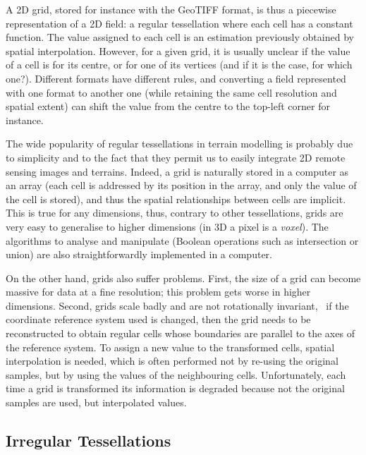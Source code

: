 %

\begin{kaobox}[frametitle=\faCog\ Concrete example: a 2D grid]
  A 2D grid, stored for instance with the GeoTIFF format, is thus a piecewise representation of a 2D field: a regular tessellation where each cell has a constant function.
  The value assigned to each cell is an estimation previously obtained by spatial interpolation.
  However, for a given grid, it is usually unclear if the value of a cell is for its centre, or for one of its vertices (and if it is the case, for which one?).
  Different formats have different rules, and converting a field represented with one format to another one (while retaining the same cell resolution and spatial extent) can shift the value from the centre to the top-left corner for instance.
\end{kaobox}

%

The wide popularity of regular tessellations in terrain modelling is probably due to simplicity and to the fact that they permit us to easily integrate 2D remote sensing images and terrains.
Indeed, a grid is naturally stored in a computer as an array (each cell is addressed by its position in the array, and only the value of the cell is stored), and thus the spatial relationships between cells are implicit. 
This is true for any dimensions, thus, contrary to other tessellations, grids are very easy to generalise to higher dimensions (in 3D a pixel is a \emph{voxel}).%
The algorithms to analyse and manipulate (Boolean operations such as intersection or union) are also straightforwardly implemented in a computer. 

On the other hand, grids also suffer problems.
First, the size of a grid can become massive for data at a fine resolution; this problem gets worse in higher dimensions.
Second, grids scale badly and are not rotationally invariant, \ie\ if the coordinate reference system used is changed, then the grid needs to be reconstructed to obtain regular cells whose boundaries are parallel to the axes of the reference system.
To assign a new value to the transformed cells, spatial interpolation is needed, which is often performed not by re-using the original samples, but by using the values of the neighbouring cells.
Unfortunately, each time a grid is transformed its information is degraded because not the original samples are used, but interpolated values.



\subsection{Irregular Tessellations} 

